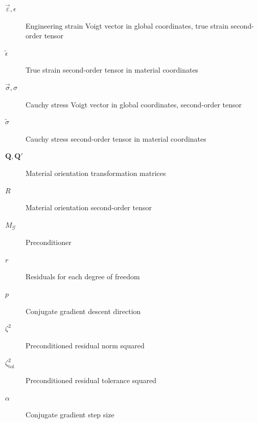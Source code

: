 \documentclass[]             %
{NASA}                       %
\begin{document}
\begin{description}
  \item[$\vec{\varepsilon}, \epsilon$] Engineering strain Voigt vector\cite{ref:voigt1928lehrbuch,ref:love2013treatise} in global coordinates, true strain second-order tensor
  \item[$\widetilde{\epsilon}$] True strain second-order tensor in material coordinates
  \item[$\vec{\sigma}, \sigma$] Cauchy stress Voigt vector in global coordinates, second-order tensor
  \item[$\widetilde{\sigma}$] Cauchy stress second-order tensor in material coordinates
  
  \item[$\mathbf{Q}, \mathbf{Q}'$] Material orientation transformation matrices
  \item[$R$] Material orientation second-order tensor
  \item[$M_{\mathcal{G}}$] Preconditioner
  \item[$r$] Residuals for each degree of freedom
  \item[$p$] Conjugate gradient descent direction
  \item[$\zeta^{2}$] Preconditioned residual norm squared
  \item[$\zeta_{\mathrm{tol}}^{2}$] Preconditioned residual tolerance squared
  \item[$\alpha$] Conjugate gradient step size

\end{description}

\newpage\listoftables\newpage
\listoffigures\newpage\listofalgorithms\newpage
\end{document}
